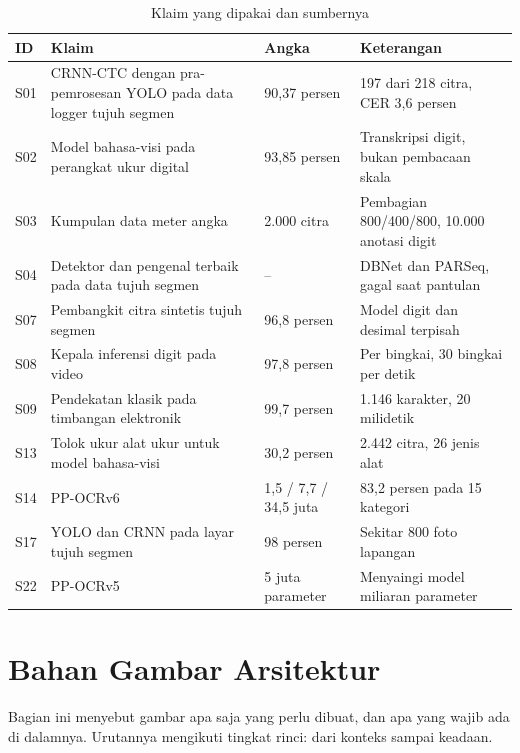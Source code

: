 \documentclass[12pt,a4paper,oneside]{report}
\begin{document}
\begin{table}[H]
\caption{Klaim yang dipakai dan sumbernya}
\label{tab:peta}
\begin{tabularx}{\textwidth}{@{}L{1.0cm} L{6.2cm} L{2.0cm} X@{}}
\toprule
\textbf{ID} & \textbf{Klaim} & \textbf{Angka} & \textbf{Keterangan} \\
\midrule
S01 & CRNN-CTC dengan pra-pemrosesan YOLO pada data logger tujuh segmen & 90,37 persen & 197 dari 218 citra, CER 3,6 persen \\
S02 & Model bahasa-visi pada perangkat ukur digital & 93,85 persen & Transkripsi digit, bukan pembacaan skala \\
S03 & Kumpulan data meter angka & 2.000 citra & Pembagian 800/400/800, 10.000 anotasi digit \\
S04 & Detektor dan pengenal terbaik pada data tujuh segmen & -- & DBNet dan PARSeq, gagal saat pantulan \\
S07 & Pembangkit citra sintetis tujuh segmen & 96,8 persen & Model digit dan desimal terpisah \\
S08 & Kepala inferensi digit pada video & 97,8 persen & Per bingkai, 30 bingkai per detik \\
S09 & Pendekatan klasik pada timbangan elektronik & 99,7 persen & 1.146 karakter, 20 milidetik \\
S13 & Tolok ukur alat ukur untuk model bahasa-visi & 30,2 persen & 2.442 citra, 26 jenis alat \\
S14 & PP-OCRv6 & 1,5 / 7,7 / 34,5 juta & 83,2 persen pada 15 kategori \\
S17 & YOLO dan CRNN pada layar tujuh segmen & 98 persen & Sekitar 800 foto lapangan \\
S22 & PP-OCRv5 & 5 juta parameter & Menyaingi model miliaran parameter \\
\bottomrule
\end{tabularx}
\end{table}

\chapter{Bahan Gambar Arsitektur}

Bagian ini menyebut gambar apa saja yang perlu dibuat, dan apa yang wajib ada di
dalamnya. Urutannya mengikuti tingkat rinci: dari konteks sampai keadaan.
\end{document}
